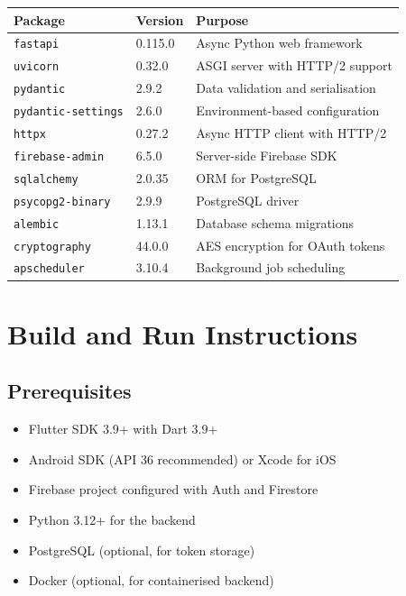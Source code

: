 \documentclass[12pt,a4paper]{article}
\begin{document}
\begin{longtable}{p{4.5cm} p{2cm} p{7.5cm}}
\toprule
\textbf{Package} & \textbf{Version} & \textbf{Purpose} \\
\midrule
\endhead
\texttt{fastapi} & 0.115.0 & Async Python web framework \\
\texttt{uvicorn} & 0.32.0 & ASGI server with HTTP/2 support \\
\texttt{pydantic} & 2.9.2 & Data validation and serialisation \\
\texttt{pydantic-settings} & 2.6.0 & Environment-based configuration \\
\texttt{httpx} & 0.27.2 & Async HTTP client with HTTP/2 \\
\texttt{firebase-admin} & 6.5.0 & Server-side Firebase SDK \\
\texttt{sqlalchemy} & 2.0.35 & ORM for PostgreSQL \\
\texttt{psycopg2-binary} & 2.9.9 & PostgreSQL driver \\
\texttt{alembic} & 1.13.1 & Database schema migrations \\
\texttt{cryptography} & 44.0.0 & AES encryption for OAuth tokens \\
\texttt{apscheduler} & 3.10.4 & Background job scheduling \\
\bottomrule
\end{longtable}

\section{Build and Run Instructions}

\subsection{Prerequisites}

\begin{itemize}
    \item Flutter SDK 3.9+ with Dart 3.9+
    \item Android SDK (API 36 recommended) or Xcode for iOS
    \item Firebase project configured with Auth and Firestore
    \item Python 3.12+ for the backend
    \item PostgreSQL (optional, for token storage)
    \item Docker (optional, for containerised backend)
\end{itemize}
\end{document}
